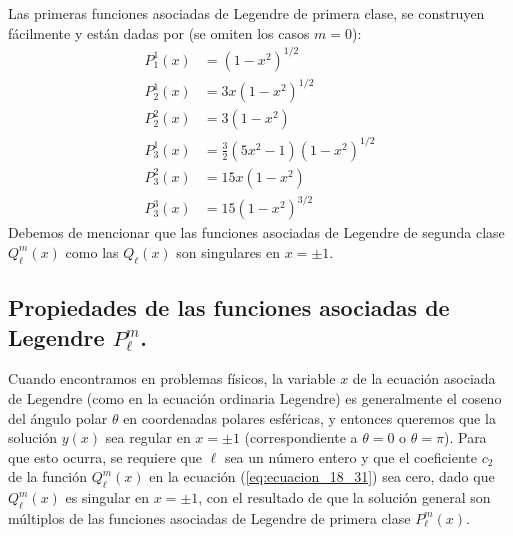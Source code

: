 \par
Las primeras funciones asociadas de Legendre de primera clase, se construyen fácilmente y están dadas por (se omiten los casos $m=0$):
\begin{align*}
P_{1}^{1} (x) &= (1-x^{2})^{1/2} \\
P_{2}^{1} (x) &= 3x (1-x^{2})^{1/2}  \\
P_{2}^{2} (x) &= 3(1-x^{2})  \\
P_{3}^{1} (x) &= \frac{3}{2}(5x^{2}-1)(1-x^{2})^{1/2} \\
P_{3}^{2} (x) &= 15x (1-x^{2}) \\
P_{3}^{3} (x) &= 15 (1-x^{2})^{3/2} 
\end{align*}
Debemos de mencionar que las funciones asociadas de Legendre de segunda clase $Q_{\ell}^{m} (x)$ como las $Q_{\ell}(x)$ son singulares en $x= \pm 1$.
\subsection*{Propiedades de las funciones asociadas de Legendre $P_{\ell}^{m}$.}
Cuando encontramos en problemas físicos, la variable $x$ de la ecuación asociada de Legendre (como en la ecuación ordinaria Legendre) es generalmente el coseno del ángulo polar $\theta$ en coordenadas polares esféricas, y entonces queremos que la solución $y (x)$ sea regular en $x = \pm 1$ (correspondiente a $\theta = 0$ o $\theta = \pi$). Para que esto ocurra, se requiere que $\ell$ sea un número entero y que el coeficiente $c_{2}$ de la función $Q_{\ell}^{m} (x)$ en la ecuación (\ref{eq:ecuacion_18_31}) sea cero, dado que $Q_{\ell}^{m}(x)$ es singular en $x = \pm 1$, con el resultado de que la solución general son múltiplos de las funciones asociadas de Legendre de primera clase $P_{\ell}^{m}(x)$.
